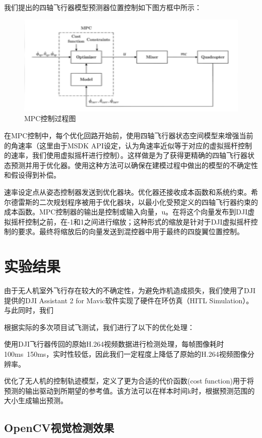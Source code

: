 我们提出的四轴飞行器模型预测器位置控制如下图方框中所示：

\begin{figure}[ht]
  \centering
  \includegraphics[width=0.8\linewidth]{./Figure/MPC-Diagram.png}
  \caption{MPC控制过程图}\label{Fig:xd1}
\end{figure}

在MPC控制中，每个优化回路开始前，使用四轴飞行器状态空间模型来增强当前的角速率（这里由于MSDK API设定，认为角速率近似等于对应的虚拟摇杆控制的速率，我们使用虚拟摇杆进行控制）。这样做是为了获得更精确的四轴飞行器状态预测并用于优化器。使用这种方法可以确保在建模过程中做出的模型的不确定性和假设得到补偿。

速率设定点从姿态控制器发送到优化器块。优化器还接收成本函数和系统约束。希尔德雷斯的二次规划程序被用于优化器块，以最小化受预定义的四轴飞行器约束的成本函数。MPC控制器的输出是控制或输入向量，u。在将这个向量发布到DJI虚拟摇杆控制之前，在-1和1之间进行缩放；这种形式的缩放是针对于DJI虚拟摇杆控制的要求。最终将缩放后的向量发送到混控器中用于最终的四旋翼位置控制。

\chapter{实验结果}

由于无人机室外飞行存在较大的不确定性，为避免炸机造成损失，我们使用了DJI提供的DJI Assistant 2 for Mavic软件实现了硬件在环仿真（HITL Simulation）。与此同时，我们

根据实际的多次项目试飞测试，我们进行了以下的优化处理：

使用DJI飞行器传回的原始H.264视频数据进行检测处理，每帧图像耗时100ms~150ms，实时性较低，因此我们一定程度上降低了原始的H.264视频图像分辨率。

优化了无人机的控制轨迹模型，定义了更为合适的代价函数(cost function)用于将预测的输出驱动到所期望的参考值。该方法可以在样本时间k时，根据预测范围的大小生成输出预测。

\section{OpenCV视觉检测效果}

